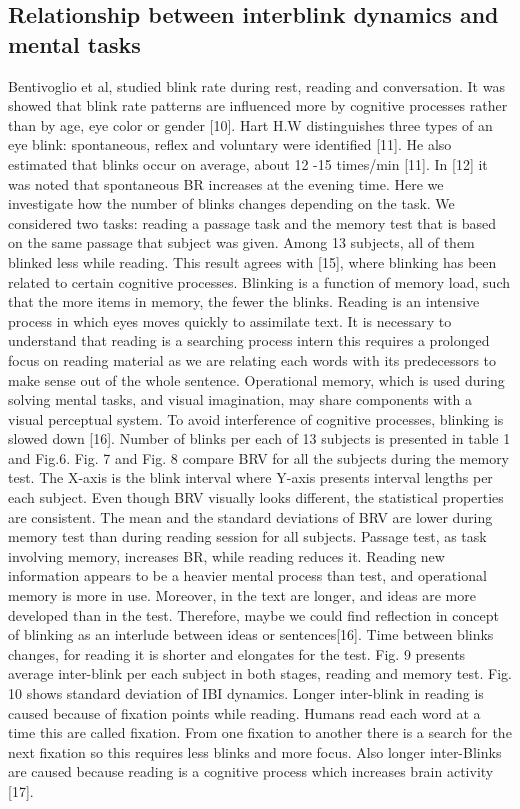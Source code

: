 \documentclass[10pt,letterpaper]{article}
\begin{document}
\subsection*{Relationship between interblink dynamics and mental tasks}
Bentivoglio et al, studied blink rate during rest, reading and conversation. It was showed that blink rate patterns are influenced more by cognitive processes rather than by age, eye color or gender [10]. Hart H.W distinguishes three types of an eye blink: spontaneous, reflex and voluntary were identified [11]. He also estimated that blinks occur on average, about 12 -15 times/min [11]. In [12] it was noted that spontaneous BR increases at the evening time. 
Here we investigate how the number of blinks changes depending on the task. We considered two tasks: reading a passage task and the memory test that is based on the same passage that subject was given. Among 13 subjects, all of them blinked less while reading. This result agrees with [15], where blinking has been related to certain cognitive processes. Blinking is a function of memory load, such that the more items in memory, the fewer the blinks.  Reading is an intensive process in which eyes moves quickly to assimilate text. It is necessary to understand that reading is a searching process intern this requires a prolonged focus on reading material as we are relating each words with its predecessors to make sense out of the whole sentence.
Operational memory, which is used during solving mental tasks, and visual imagination, may share components with a visual perceptual system. To avoid interference of cognitive processes, blinking is slowed down [16]. Number of blinks per each of 13 subjects is presented in table 1 and Fig.6. 
Fig. 7 and Fig. 8 compare BRV for all the subjects during the memory test. The X-axis is the blink interval where Y-axis presents interval lengths per each subject. Even though BRV visually looks different, the statistical properties are consistent. The mean and the standard deviations of BRV are lower during memory test than during reading session for all subjects. Passage test, as task involving memory, increases BR, while reading reduces it. Reading new information appears to be a heavier mental process than test, and operational memory is more in use. Moreover, in the text are longer, and ideas are more developed than in the test. Therefore, maybe we could find reflection in concept of blinking as an interlude between ideas or sentences[16]. 
Time between blinks changes, for reading it is shorter and elongates for the test. Fig. 9 presents average inter-blink per each subject in both stages, reading and memory test. Fig. 10 shows standard deviation of IBI dynamics.  Longer inter-blink in reading is caused because of fixation points while reading. Humans read each word at a time this are called fixation. From one fixation to another there is a search for the next fixation so this requires less blinks and more focus.  Also longer inter-Blinks are caused because reading is a cognitive process which increases brain activity [17].
\end{document}
